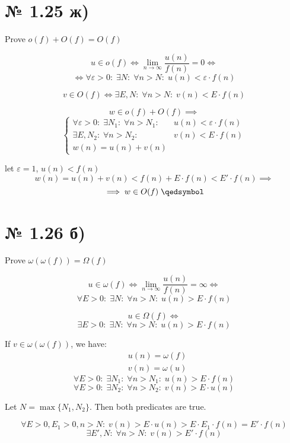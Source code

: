 \documentclass[11pt, a4paper]{article} %
\begin{document}
\section*{№ 1.25 ж)}
\begin{mdframed}
    Prove $o(f) + O(f) = O(f)$
\end{mdframed}

$$u \in o(f) \iff
\underset{n\to \infty}{\lim} \frac{u(n)}{f(n)} = 0 \iff
$$
$$\iff \forall \varepsilon>0:\; \exists N:\; \forall n>N:\; u(n) < \varepsilon \cdot f(n)$$

$$v\in O(f) \iff \exists E, N:\; \forall n>N:\; v(n) < E\cdot f(n)$$

$$w \in o(f) + O(f) \implies$$
$$\left\{ \begin{array}{ll}
\forall \varepsilon>0:\; \exists N_1:\; \forall n>N_1:\;& u(n) < \varepsilon \cdot f(n)  \\
\exists E, N_2:\; \forall n>N_2:\;& v(n) < E\cdot f(n) \\
w(n) = u(n) + v(n)
\end{array}\right.$$

let $\varepsilon = 1$, $u(n) < f(n)$
$$
w(n) = u(n) + v(n) < f(n) + E\cdot f(n) < E' \cdot f(n) \implies
$$
$$\implies w \in O(f) \; \qedsymbol$$

\section*{№ 1.26 б)}
\begin{mdframed}
    Prove $\omega(\omega(f)) = \Omega(f)$
\end{mdframed}

$$u\in \omega(f) \iff 
\underset{n\to \infty}{\lim} \frac{u(n)}{f(n)} = \infty \iff$$
$$\forall E>0:\; \exists N:\; \forall n>N:\; u(n) > E \cdot f(n)$$

$$u\in \Omega(f) \iff $$
$$\exists E>0:\; \exists N:\; \forall n>N:\; u(n) > E \cdot f(n)$$

If $v \in \omega(\omega(f))$, we have:
\begin{align*}
    & u(n) = \omega(f)\\
    & v(n) = \omega(u)
\end{align*}
$$\forall E>0:\; \exists N_1:\; \forall n>N_1:\; u(n) > E \cdot f(n)$$
$$\forall E>0:\; \exists N_2:\; \forall n>N_2:\; v(n) > E\cdot u(n)$$

Let $N = \max\{N_1, N_2\}$. Then both predicates are true.

$$\forall E>0, E_1>0, n>N:\; v(n) > E\cdot u(n) > E \cdot E_1 \cdot f(n) = E' \cdot f(n)$$
$$\exists E', N:\; \forall n>N:\; v(n)> E'\cdot f(n)$$
\end{document}
